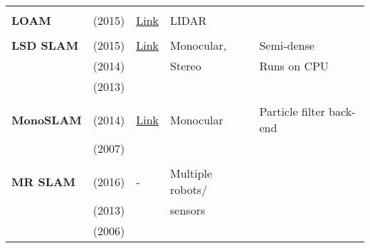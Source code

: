 \documentclass[a4paper,12pt]{scrartcl}
\begin{document}
{\begin{longtable}{l|l|l|l|l}
                           &                                   &                                                                    &                       &\\
    \textbf{LOAM}          & \cite{Zhang2015a} (2015)          & {\href{https://github.com/daobilige-su/loam_continuous}{Link}}     & LIDAR                 &\\
                           &                                   &                                                                    &                       &\\
    \textbf{LSD SLAM}      & \cite{Engel2015} (2015)           & {\href{https://github.com/tum-vision/lsd_slam}{Link}}              & Monocular,            & Semi-dense\\
                           & \cite{Engel2014} (2014)           &                                                                    & Stereo                & Runs on CPU\\
                           & \cite{Engel2013} (2013)           &                                                                    &                       &\\
                           &                                   &                                                                    &                       &\\
    \textbf{MonoSLAM}      & \cite{Russo2014} (2014)           & {\href{https://github.com/rrg-polito/mono-slam}{Link}}             & Monocular             & Particle filter back-end\\
                           & \cite{Davison2007} (2007)         &                                                                    &                       &\\
                           &                                   &                                                                    &                       &\\
    \textbf{MR SLAM}       & \cite{Choudhary2016} (2016)       & -                                                                  & Multiple robots/      &\\
                           & \cite{Alexandre2013} (2013)       &                                                                    & sensors               &\\
                           & \cite{Zhou2006} (2006)            &                                                                    &                       &\\

\end{longtable}}
\end{document}
